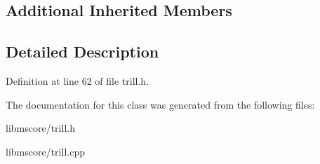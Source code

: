 \subsection*{Additional Inherited Members}


\subsection{Detailed Description}


Definition at line 62 of file trill.\+h.



The documentation for this class was generated from the following files\+:\begin{DoxyCompactItemize}
\item 
libmscore/trill.\+h\item 
libmscore/trill.\+cpp\end{DoxyCompactItemize}
